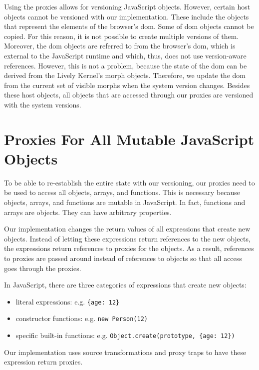Using the proxies allows for versioning JavaScript objects.
However, certain host objects cannot be versioned with our implementation.
These include the objects that represent the elements of the browser's \ac{dom}.
Some of \ac{dom} objects cannot be copied.
For this reason, it is not possible to create multiple versions of them.
Moreover, the \ac{dom} objects are referred to from the browser's \ac{dom}, which is external to the JavaScript runtime and which, thus, does not use version-aware references.
However, this is not a problem, because the state of the \ac{dom} can be derived from the Lively Kernel's morph objects.
Therefore, we update the \ac{dom} from the current set of visible morphs when the system version changes.
Besides these host objects, all objects that are accessed through our proxies are versioned with the system versions.





\section{Proxies For All Mutable JavaScript Objects}

To be able to re-establish the entire state with our versioning, our proxies need to be used to access all objects, arrays, and functions.
This is necessary because objects, arrays, and functions are mutable in JavaScript.
In fact, functions and arrays are objects.
They can have arbitrary properties.

Our implementation changes the return values of all expressions that create new objects.
Instead of letting these expressions return references to the new objects, the expressions return references to proxies for the objects.
As a result, references to proxies are passed around instead of references to objects so that all access goes through the proxies.

In JavaScript, there are three categories of expressions that create new objects: 
\begin{itemize}
    \item literal expressions: e.g. \lstinline|{age: 12}|
    \item constructor functions: e.g. \lstinline|new Person(12)|
    \item specific built-in functions: e.g. \lstinline|Object.create(prototype, {age: 12})|
\end{itemize}

Our implementation uses source transformations and proxy traps to have these expression return proxies.


